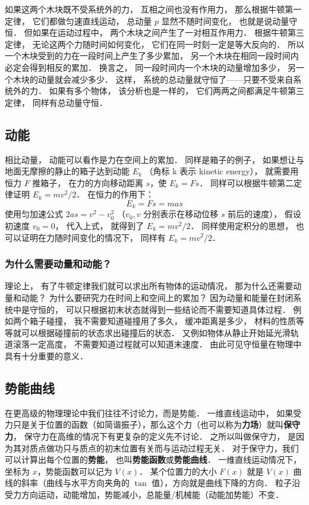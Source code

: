 如果这两个木块既不受系统外的力， 互相之间也没有作用力， 那么根据牛顿第一定律， 它们都做匀速直线运动， 总动量 $p$ 显然不随时间变化， 也就是说动量守恒． 但如果在运动过程中， 两个木块之间产生了一对相互作用力． 根据牛顿第三定律， 无论这两个力随时间如何变化， 它们在同一时刻一定是等大反向的． 所以一个木块受到的力在一段时间上产生了多少累加， 另一个木块在相同一段时间内必定会得到相反的累加． 换言之， 同一段时间内一个木块的动量增加多少， 另一个木块的动量就会减少多少． 这样， 系统的总动量就守恒了——只要不受来自系统外的力． 如果有多个物体， 该分析也是一样的， 它们两两之间都满足牛顿第三定律， 同样有总动量守恒．

\subsection{动能}
相比动量， 动能可以看作是力在空间上的累加． 同样是箱子的例子， 如果想让与地面无摩擦的静止的箱子达到动能 $E_k$ （角标 k 表示 kinetic energy）， 就需要用恒力 $F$ 推箱子， 在力的方向移动距离 $s$，使 $E_k = Fs$． 同样可以根据牛顿第二定律证明 $E_k = mv^2/2$． 在恒力的作用下：
\begin{equation}
E_k = Fs = mas
\end{equation}
使用匀加速公式 $2as = v^2 - v_0^2$ （$v_0, v$ 分别表示在移动位移 $s$ 前后的速度）， 假设初速度 $v_0 = 0$， 代入上式， 就得到了 $E_k = mv^2/2$． 同样使用定积分的思想， 也可以证明在力随时间变化的情况下， 同样有 $E_k = mv^2/2$．

\subsubsection{为什么需要动量和动能？}
理论上， 有了牛顿定律我们就可以求出所有物体的运动情况， 那为什么还需要动量和动能？ 为什么要研究力在时间上和空间上的累加？ 因为动量和能量在封闭系统中是守恒的， 可以只根据初末状态就得到一些结论而不需要知道具体过程． 例如两个箱子碰撞， 我不需要知道碰撞用了多久， 缓冲距离是多少， 材料的性质等等就可以根据碰撞前的状态求出碰撞后的状态． 又例如物体从静止开始延光滑轨道滚落一定高度， 不需要知道过程就可以知道末速度． 由此可见守恒量在物理中具有十分重要的意义．

\subsection{势能曲线}
在更高级的物理理论中我们往往不讨论力，而是势能． 一维直线运动中， 如果受力只是关于位置的函数（如简谐振子），那么这个力（也可以称为\textbf{力场}）就叫\textbf{保守力}， 保守力在高维的情况下有更复杂的定义先不讨论． 之所以叫做保守力， 是因为其对质点做功只与质点的初末位置有关而与运动过程无关． 对于保守力，我们可以计算出每个位置的\textbf{势能}， 也叫\textbf{势能函数}或\textbf{势能曲线}． 一维直线运动情况下，坐标为 $x$，势能函数可以记为 $V(x)$． 某个位置力的大小 $F(x)$ 就是 $V(x)$ 曲线的斜率（曲线与水平方向夹角的 $\tan$ 值），方向就是曲线下降的方向． 粒子沿受力方向运动，动能增加，势能减小，总能量/机械能（动能加势能）不变．

